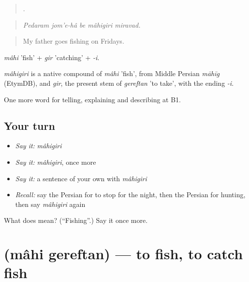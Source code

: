 \begin{quote}
     .
\end{quote}

\begin{quote}
\emph{Pedaram jom'e-hâ be mâhigiri miravad.}
\end{quote}

\begin{quote}
My father goes fishing on Fridays.
\end{quote}

\emph{mâhi} 'fish' + \emph{gir} 'catching' + \emph{-i}.

\begin{cousinweb}
\emph{mâhigiri} is a native compound of \emph{mâhi} 'fish', from Middle Persian \emph{māhīg} (EtymDB), and \emph{gir}, the present stem of \emph{gereftan} 'to take', with the ending \emph{-i}.
\end{cousinweb}

\begin{grammarlens}[title={What you've built}]
One more word for telling, explaining and describing at B1.
\end{grammarlens}

\subsection*{Your turn}
\begin{itemize}
\raggedright
  \item \emph{Say it:} \emph{mâhigiri}
  \item \emph{Say it:} \emph{mâhigiri}, once more
  \item \emph{Say it:} a sentence of your own with \emph{mâhigiri}
  \item \emph{Recall:} say the Persian for to stop for the night, then the Persian for hunting, then say \emph{mâhigiri} again
\end{itemize}

\begin{tcolorbox}[breakable,colback=teal!4,colframe=teal!35!black,title={Before you move on}]
What does  mean? (\textquotedblleft{}Fishing\textquotedblright{}.) Say it once more.
\end{tcolorbox}
\section[\texorpdfstring{\fa{ماهی} \fa{گرفتن} (mâhi gereftan)}{ماهی گرفتن (mâhi gereftan)}]{  (mâhi gereftan) — to fish, to catch fish}


